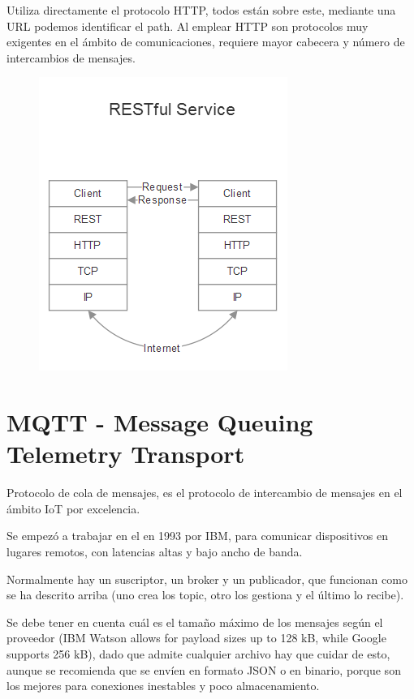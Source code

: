 \documentclass[12pt, twoside, openright]{report} %
\begin{document}
Utiliza directamente el protocolo HTTP, todos están sobre este, mediante una URL podemos identificar el path.
Al emplear HTTP son protocolos muy exigentes en el ámbito de comunicaciones, requiere mayor cabecera y número de intercambios de mensajes.
\vspace{-1.5cm}
\begin{figure}[H]
	{\includegraphics[scale=.7]{2021-04-08 09_36_12-2021-04-07 17-01-12.mkv.png}}
\end{figure}

\section{MQTT - Message Queuing Telemetry Transport}
Protocolo de cola de mensajes, es el protocolo de intercambio de mensajes en el ámbito IoT por excelencia.

Se empezó a trabajar en el en 1993 por IBM, para comunicar dispositivos en lugares remotos, con latencias altas y bajo ancho de banda.

Normalmente hay un suscriptor, un broker y un publicador, que funcionan como se ha descrito arriba (uno crea los topic, otro los gestiona y el último lo recibe).

Se debe tener en cuenta cuál es el tamaño máximo de los mensajes según el proveedor (IBM Watson allows for payload sizes up to 128 kB, while Google supports 256 kB), dado que admite cualquier archivo hay que cuidar de esto, aunque se recomienda que se envíen en formato JSON o en binario, porque son los mejores para conexiones inestables y poco almacenamiento.
\end{document}
